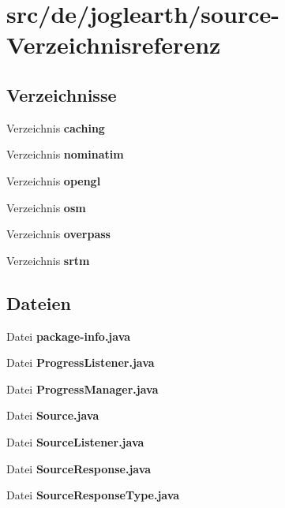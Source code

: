 \section{src/de/joglearth/source-\/\-Verzeichnisreferenz}
\label{dir_2adf1bc516f63e89372cf4e59d3c4e49}
\subsection*{Verzeichnisse}
\begin{DoxyCompactItemize}
\item 
Verzeichnis {\bf caching}
\item 
Verzeichnis {\bf nominatim}
\item 
Verzeichnis {\bf opengl}
\item 
Verzeichnis {\bf osm}
\item 
Verzeichnis {\bf overpass}
\item 
Verzeichnis {\bf srtm}
\end{DoxyCompactItemize}
\subsection*{Dateien}
\begin{DoxyCompactItemize}
\item 
Datei {\bfseries package-\/info.\-java}
\item 
Datei {\bfseries Progress\-Listener.\-java}
\item 
Datei {\bfseries Progress\-Manager.\-java}
\item 
Datei {\bfseries Source.\-java}
\item 
Datei {\bfseries Source\-Listener.\-java}
\item 
Datei {\bfseries Source\-Response.\-java}
\item 
Datei {\bfseries Source\-Response\-Type.\-java}
\end{DoxyCompactItemize}
